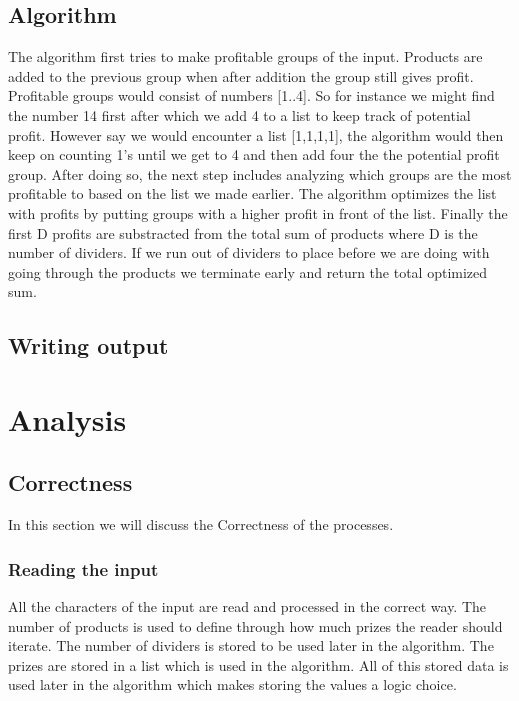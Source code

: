 \documentclass{article}
\begin{document}
\subsection{Algorithm}
The algorithm first tries to make profitable groups of the input. Products are added to the previous group when after addition the group still gives profit. Profitable groups would consist of numbers [1..4]. So for instance we might find the number 14 first after which we add 4 to a list to keep track of potential profit. However say we would encounter a list [1,1,1,1], the algorithm would then keep on counting 1's until we get to 4 and then add four the the potential profit group.
\newline
\newline
After doing so, the next step includes analyzing which groups are the most profitable to based on the list we made earlier. The algorithm optimizes the list with profits by putting groups with a higher profit in front of the list.
\newline
\newline
Finally the first D profits are substracted from the total sum of products where D is the number of dividers. If we run out of dividers to place before we are doing with going through the products we terminate early and return the total optimized sum.

\subsection{Writing output}

\newpage
\section{Analysis}

\subsection{Correctness}
In this section we will discuss the Correctness of the processes.

\subsubsection{Reading the input}
All the characters of the input are read and processed in the correct way. The number of products is used to define through how much prizes the reader should iterate. The number of dividers is stored to be used later in the algorithm. The prizes are stored in a list which is used in the algorithm. All of this stored data is used later in the algorithm which makes storing the values a logic choice.
\end{document}
